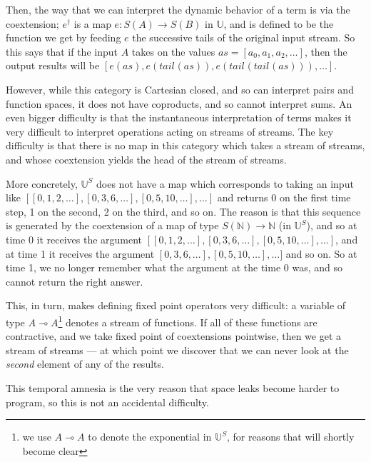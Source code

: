 \documentclass[preprint]{sigplanconf}
\newcommand{\ultrametric}{\mathbb{U}}
\newcommand{\N}{\mathbb{N}}
\newcommand{\lolli}{\multimap}
\newcommand{\tail}[2][]{\mathit{tail}^{#1}(#2)}
\begin{document}
Then, the way that we can interpret the dynamic behavior of a term is
via the coextension; $e^\dagger$ is a map $e : S(A) \to S(B)$ in
$\ultrametric$, and is defined to be the function we get by feeding
$e$ the successive tails of the original input stream. So this says
that if the input $A$ takes on the values $as = [a_0, a_1, a_2,
  \ldots]$, then the output results will be $[e(as), e(\tail{as}),
  e(\tail{\tail{as}}), \ldots]$.

However, while this category is Cartesian closed, and so can interpret
pairs and function spaces, it does not have coproducts, and so cannot
interpret sums. An even bigger difficulty is that the instantaneous
interpretation of terms makes it very difficult to interpret
operations acting on streams of streams. The key difficulty is that
there is no map in this category which takes a stream of streams, and
whose coextension yields the head of the stream of streams.

More concretely, $\ultrametric^S$ does not have a map which
corresponds to taking an input like $[[0,1,2,\ldots], [0,3,6,\ldots],
  [0,5,10,\ldots], \ldots]$ and returns 0 on the first time step, 1 on
the second, 2 on the third, and so on. The reason is that this
sequence is generated by the coextension of a map of type $S(\N) \to
\N$ (in $\ultrametric^S$), and so at time 0 it receives the argument
$[[0,1,2,\ldots], [0,3,6,\ldots], [0,5,10,\ldots], \ldots]$, and at
time 1 it receives the argument $[0,3,6,\ldots], [0,5,10,\ldots],
\ldots]$ and so on. So at time 1, we no longer remember what the
argument at the time 0 was, and so cannot return the right answer.

This, in turn, makes defining fixed point operators very difficult: a
variable of type $A \lolli A$\footnote{we use $A \lolli A$ to denote
the exponential in $\ultrametric^S$, for reasons that will shortly
become clear} denotes a stream of functions. If all of these
functions are contractive, and we take fixed point of coextensions
pointwise, then we get a stream of streams --- at which point we
discover that we can never look at the \emph{second} element of any of
the results.

This temporal amnesia is the very reason that space leaks become
harder to program, so this is not an accidental difficulty. 
\end{document}
